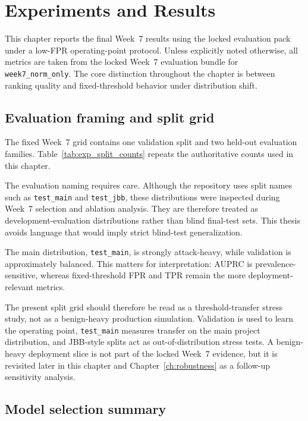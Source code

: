 \chapter{Experiments and Results}
\label{ch:experiments}

This chapter reports the final Week~7 results using the locked evaluation pack under a low-FPR operating-point protocol. Unless explicitly noted otherwise, all metrics are taken from the locked Week~7 evaluation bundle for \texttt{week7\_norm\_only}. The core distinction throughout the chapter is between ranking quality and fixed-threshold behavior under distribution shift.

\section{Evaluation framing and split grid}

The fixed Week~7 grid contains one validation split and two held-out evaluation families. Table~\ref{tab:exp_split_counts} repeats the authoritative counts used in this chapter.



The evaluation naming requires care. Although the repository uses split names such as \texttt{test\_main} and \texttt{test\_jbb}, these distributions were inspected during Week~7 selection and ablation analysis. They are therefore treated as development-evaluation distributions rather than blind final-test sets. This thesis avoids language that would imply strict blind-test generalization.

The main distribution, \texttt{test\_main}, is strongly attack-heavy, while validation is approximately balanced. This matters for interpretation: AUPRC is prevalence-sensitive, whereas fixed-threshold FPR and TPR remain the more deployment-relevant metrics.

The present split grid should therefore be read as a threshold-transfer stress study, not as a benign-heavy production simulation. Validation is used to learn the operating point, \texttt{test\_main} measures transfer on the main project distribution, and JBB-style splits act as out-of-distribution stress tests. A benign-heavy deployment slice is not part of the locked Week~7 evidence, but it is revisited later in this chapter and Chapter~\ref{ch:robustness} as a follow-up sensitivity analysis.

\section{Model selection summary}


